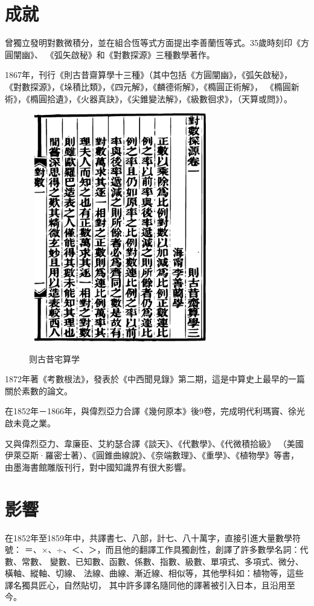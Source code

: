 \documentclass[a4paper, 11pt]{book}
\begin{document}
\section*{成就}
\indent
曾獨立發明對數微積分，並在組合恆等式方面提出李善蘭恆等式。35歲時刻印《方圓闡幽》、
《弧矢啟秘》和《對數探源》三種數學著作。

\indent
1867年，刊行《則古昔齋算學十三種》（其中包括《方圓闡幽》，《弧矢啟秘》，
《對數探源》，《垛積比類》，《四元解》，《麟德術解》，《橢圓正術解》，
《橢圓新術》，《橢圓拾遺》，《火器真訣》，《尖錐變法解》，《級數徊求》，（天算或問》）。

\begin{figure}[htbp]
    \centering
    \includegraphics[width=8cm, height=10cm]{./Figs/suanxue.eps}
    \label{fig:suanxue}
    \caption{则古昔宅算学}
\end{figure}
\indent
1872年著《考數根法》，發表於《中西聞見錄》第二期，這是中算史上最早的一篇關於素數的論文。

\indent
在1852年－1866年，與偉烈亞力合譯《幾何原本》後9卷，完成明代利瑪竇、徐光啟未竟之業。

\indent
又與偉烈亞力、韋廉臣、艾約瑟合譯《談天》、《代數學》、《代微積拾級》
（美國伊萊亞斯·羅密士著）、《圓錐曲線說》、《奈端數理》、《重學》、《植物學》等書，
由墨海書館雕版刊行，對中國知識界有很大影響。


\section*{影響}

\indent
在1852年至1859年中，共譯書七、八部，計七、八十萬字，直接引進大量數學符號：
＝、×、÷、＜、＞，而且他的翻譯工作具獨創性，創譯了許多數學名詞：代數、常數、
變數、已知數、函數、係數、指數、級數、單項式、多項式、微分、橫軸、縱軸、切線、
法線、曲線、漸近線、相似等，其他學科如：植物等，這些譯名獨具匠心，自然貼切，
其中許多譯名隨同他的譯著被引入日本，且沿用至今。
\end{document}
